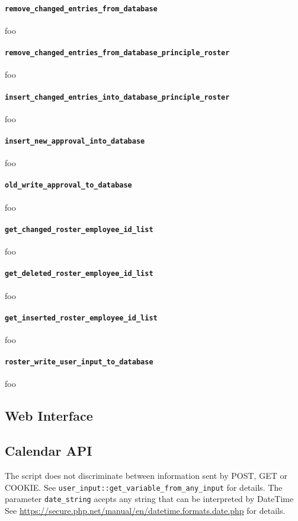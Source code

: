 \paragraph{\lstinline|remove_changed_entries_from_database|} foo
\paragraph{\lstinline|remove_changed_entries_from_database_principle_roster|} foo
\paragraph{\lstinline|insert_changed_entries_into_database_principle_roster|} foo
\paragraph{\lstinline|insert_new_approval_into_database|} foo
\paragraph{\lstinline|old_write_approval_to_database|} foo
\paragraph{\lstinline|get_changed_roster_employee_id_list|} foo
\paragraph{\lstinline|get_deleted_roster_employee_id_list|} foo
\paragraph{\lstinline|get_inserted_roster_employee_id_list|} foo
\paragraph{\lstinline|roster_write_user_input_to_database|} foo






\subsection{Web Interface}

\subsection{Calendar API}
The script does not discriminate between information sent by POST, GET or COOKIE.
See \lstinline|user_input::get_variable_from_any_input| for details.
The parameter \lstinline|date_string| acepts any string that can be interpreted by DateTime
See \url{https://secure.php.net/manual/en/datetime.formats.date.php} for details.



